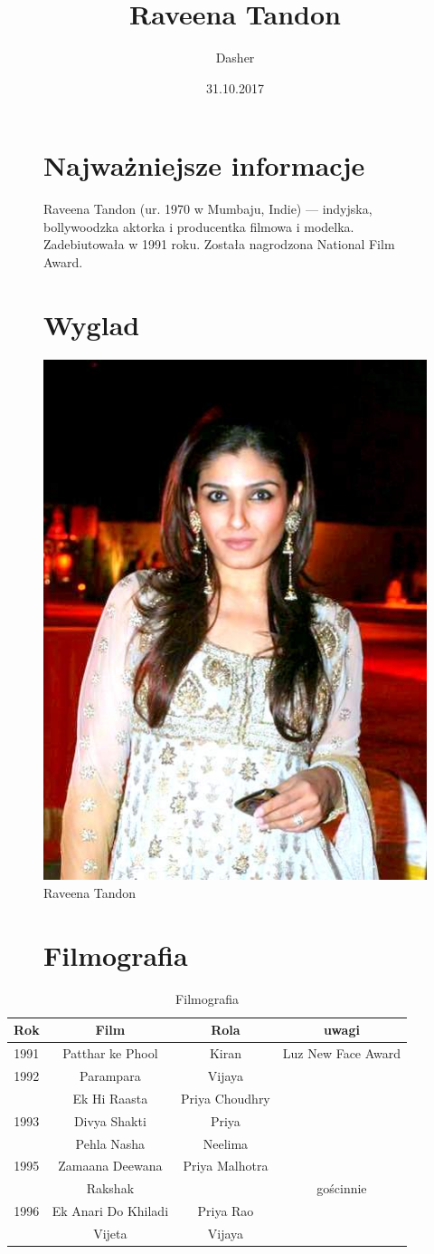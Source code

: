\documentclass[a4paper,12pt]{article}
\title{Raveena Tandon}
\author{Dasher}
\date{31.10.2017}
\begin{document}
\begin{figure}
\maketitle
\end{figure}

\begin{figure}
\section{Najważniejsze informacje}
Raveena Tandon (ur. 1970 w Mumbaju, Indie) --- indyjska, bollywoodzka aktorka i producentka filmowa i modelka. Zadebiutowała w 1991 roku. Została nagrodzona National Film Award.
\end{figure}

\begin{figure}
\section{Wyglad}
\centering
\includegraphics[width=0.25\hsize]{RaveenaTandon.jpg}
\caption{Raveena Tandon}
\end{figure}

\begin{figure}
\section{Filmografia}
\end{figure}
\begin{table}
	\begin{tabular}{c|c|c|c}
	\hline
	\textbf{Rok}&\textbf{Film}&\textbf{Rola}&\textbf{uwagi}\\
	\hline
	1991&Patthar ke Phool&Kiran&Luz New Face Award\\
	\hline
	1992&Parampara&Vijaya\\
	\hline
	&Ek Hi Raasta&Priya Choudhry&\\
	1993&Divya Shakti&Priya\\
	&Pehla Nasha&Neelima&\\
	\hline
	1995&Zamaana Deewana&Priya Malhotra	&\\
	\hline
	&Rakshak&&gościnnie\\
	1996&Ek Anari Do Khiladi&Priya Rao&\\
	&Vijeta&Vijaya&\\
	\end{tabular}
\caption{Filmografia}
\end{table}

\begin{figure}
\tableofcontents
\listoffigures
\listoftables
\end{figure}
\end{document}
